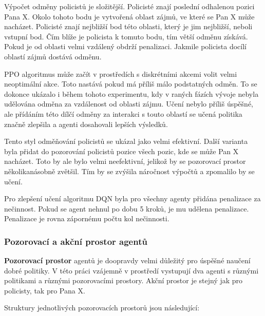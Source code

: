 Výpočet odměny policistů je složitější.
Policisté znají poslední odhalenou pozici Pana X\@.
Okolo tohoto bodu je vytvořená oblast zájmů, ve které se Pan X může nacházet.
Policisté znají nejbližší bod této oblasti, který je jim nejbližší, neboli vstupní bod.
Čím blíže je policista k tomuto bodu, tím větší odměnu získává.
Pokud je od oblasti velmi vzdálený obdrží penalizaci.
Jakmile policista docílí oblastí zájmů dostává odměnu.

PPO algoritmus může začít v prostředích s diskrétními akcemi volit velmi neoptimální akce.
Toto nastává pokud má příliš málo podstatných odměn\cite{PPO_weakness}.
To se dokonce ukázalo i během tohoto experimentu, kdy v raných fázích vývoje nebyla udělována odměna za vzdálenost od oblasti zájmu.
Učení nebylo příliš úspěšné, ale přídáním této dílčí odměny za interakci s touto oblastí se učená politika značně zlepšila a agenti dosahovali lepších výsledků.

Tento styl odměňování policistů se ukázal jako velmi efektivní.
Další varianta byla přidat do pozorování policistů pozice všech pozic, kde se může Pan X nacházet.
Toto by ale bylo velmi neefektivní, jelikož by se pozorovací prostor několikanásobně zvětšil.
Tím by se zvýšila náročnost výpočtů a zpomalilo by se učení.

\bigskip

Pro zlepšení učení algoritmu DQN byla pro všechny agenty přidána penalizace za nečinnost.
Pokud se agent nehnul po dobu 5 kroků, je mu udělena penalizace.
Penalizace je rovna zápornému počtu kol nečinnosti.

\subsubsection*{Pozorovací a akční prostor agentů}

\textbf{Pozorovací prostor} agentů je doopravdy velmi důležitý pro úspěšné naučení dobré politiky.
V této práci vzájemně v prostředí vystupují dva agenti s různými politikami a různými pozorovacími prostory.
Akční prostor je stejný jak pro policisty, tak pro Pana X\@.

Struktury jednotlivých pozorovacích prostorů jsou následující:

